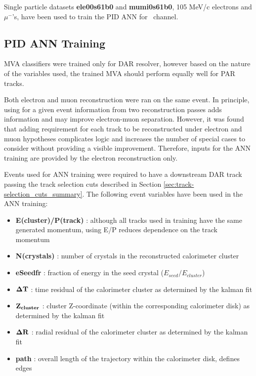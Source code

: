 Single particle datasets {\bf ele00s61b0} and {\bf mumi0s61b0},  105 MeV/c electrons and$\mu^-$'s,
have been used to train the PID ANN for \MuToEm\ channel.

\subsection {PID ANN Training }
\label{sec:mumem_pid_ann_training}

MVA classifiers were trained only for DAR resolver, however based on the nature of 
the variables used, the trained MVA should perform equally well for PAR tracks.

Both electron and muon reconstruction were ran on the same event. In principle, using 
for a given event information from two reconstruction passes adds information and may
improve electron-muon separation. However, it was found that adding requirement for each
track to be reconstructed under electron and muon hypotheses complicates logic and increases
the number of special cases to consider without providing a visible improvement. Therefore,
inputs for the ANN training are provided by the electron reconstruction only.

Events used for ANN training were required to have a downstream DAR track passing
the track selection cuts described in Section \ref{sec:track-selection_cuts_summary}.
%
The following event variables have been used in the ANN training:

\begin{itemize}
\item 
  {\bf E(cluster)/P(track)} : although all tracks used in training have the same generated momentum,
  using E/P reduces dependence on the track momentum 
\item 
  {\bf N(crystals)} : number of crystals in the reconstructed calorimeter cluster
\item 
  {\bf eSeedfr} : fraction of energy in the seed crystal ($E_{seed}/E_{cluster}$)
\item 
  {$\bf \Delta T$} : time residual of the calorimeter cluster as determined by the kalman fit
\item 
  {$\bf Z_{cluster}$} : cluster Z-coordinate (within the corresponding calorimeter disk) as determined by the kalman fit
\item 
  {$\bf \Delta R$} : radial residual of the calorimeter cluster as determined by the kalman fit
\item 
  {\bf path} : overall length of the trajectory within the calorimeter disk, defines edges
\end{itemize}

